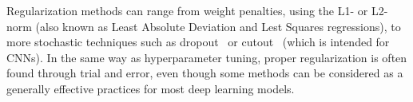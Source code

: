 Regularization methods can range from weight penalties, using the L1- or
L2-norm (also known as Least Absolute Deviation and Lest Squares regressions),
to more stochastic techniques such as dropout~\cite{Dropout} or
cutout~\cite{Cutout} (which is intended for CNNs). In the same way as
hyperparameter tuning, proper regularization is often found through trial and
error, even though some methods can be considered as a generally effective
practices for most deep learning models.

